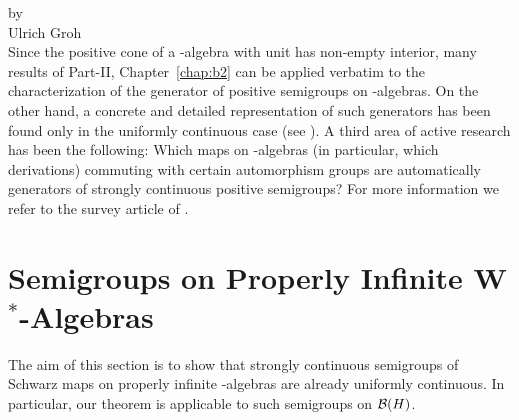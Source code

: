 \label{chap:d2}
\thispagestyle{empty}
{\Large
\vspace*{-.75cm}
by \\[.25em]
Ulrich Groh
\vspace{.75cm}
\\
}
Since the positive cone of a \CA-algebra with unit has non-empty interior, many results of Part-II, Chapter~\ref{chap:b2} can be applied verbatim to the characterization of the generator of positive semigroups on \CA-algebras.
On the other hand, a concrete and detailed representation of such generators has been found only in the uniformly continuous case (see \textcite{lindblad:1976}).
A third area of active research has been the following: Which maps on \CA-algebras (in particular, which derivations) commuting with certain automorphism groups are automatically generators of strongly continuous positive semigroups?
For more information we refer to the survey article of \textcite{evans:1984}.
\section{Semigroups on Properly Infinite \texorpdfstring{W$^{*}$-Algebras}{W*-Algebras}}
The aim of this section is to show that strongly continuous semigroups of Schwarz maps on properly infinite \WA-algebras are already uniformly continuous.
In particular, our theorem is applicable to such semigroups on $\mathcal{B}(H)$.

